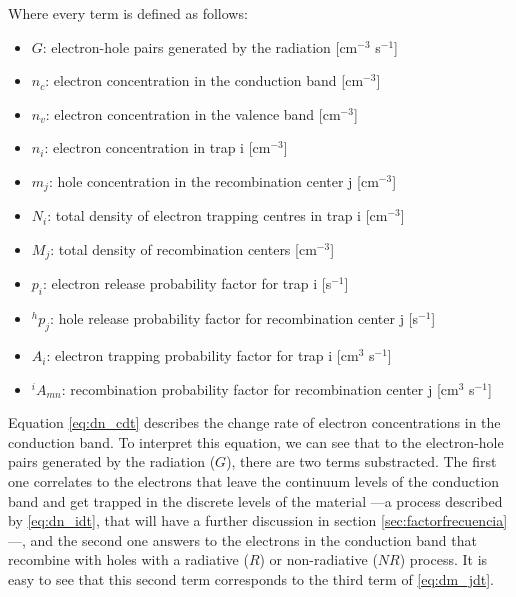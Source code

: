 \vspace{15pt}
Where every term is defined as follows:
\begin{itemize}[itemsep=0.2cm,parsep=0cm]
  \item $G$: electron-hole pairs generated by the radiation [cm$^{-3}$ s$^{-1}$]
  \item $n_c$: electron concentration in the conduction band [cm$^{-3}$]
  \item $n_v$: electron concentration in the valence band [cm$^{-3}$]
  \item $n_i$: electron concentration in trap i [cm$^{-3}$]
  \item $m_j$: hole concentration in the recombination center j [cm$^{-3}$]
  \item $N_i$: total density of electron trapping centres in trap i [cm$^{-3}$]
  \item $M_j$: total density of recombination centers [cm$^{-3}$]
  \item $p_i$: electron release probability factor for trap i [s$^{-1}$]
  \item $^hp_j$: hole release probability factor for recombination center j [s$^{-1}$]
  \item $A_i$: electron trapping probability factor for trap i [cm$^{3}$ s$^{-1}$]
  \item $^iA_{mn}$: recombination probability factor for recombination center j [cm$^{3}$ s$^{-1}$]
\end{itemize}

\vspace{10pt}

Equation \ref{eq:dn_cdt} describes the change rate of electron concentrations in the conduction band. To interpret this equation, we can see that to the electron-hole pairs generated by the radiation ($G$), there are two terms substracted. The first one correlates to the electrons that leave the continuum levels of the conduction band and get trapped in the discrete levels of the material ---a process described by \ref{eq:dn_idt}, that will have a further discussion in section \ref{sec:factorfrecuencia}---, and the second one answers to the electrons in the conduction band that recombine with holes with a radiative ($R$) or non-radiative ($N\!R$) process. It is easy to see that this second term corresponds to the third term of \ref{eq:dm_jdt}. 

